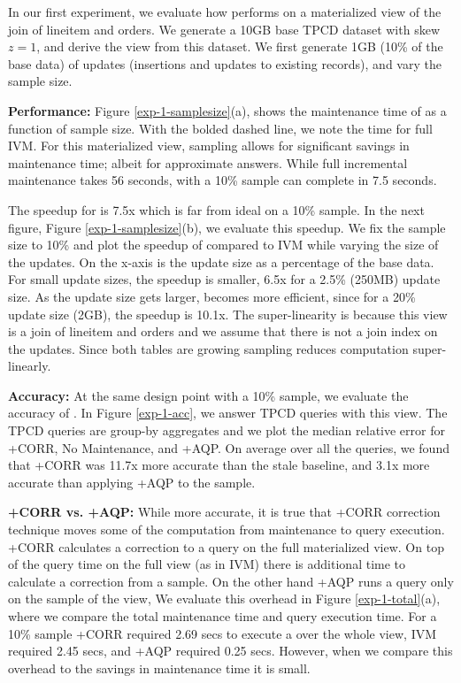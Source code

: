 In our first experiment, we evaluate how \svc performs on a materialized view of the join of \textsf{lineitem} and \textsf{orders}.
We generate a 10GB base TPCD dataset with skew $z=1$, and derive the view from this dataset.
We first generate 1GB (10\% of the base data) of updates (insertions and updates to existing records), and vary the sample size.

\textbf{Performance:}
Figure \ref{exp-1-samplesize}(a), shows the maintenance time of \svc as a function of sample size.
With the bolded dashed line, we note the time for full IVM. 
For this materialized view, sampling allows for significant savings in maintenance time; albeit for approximate answers.
While full incremental maintenance takes 56 seconds, \svc with a 10\% sample can complete in 7.5 seconds.

The speedup for  is 7.5x which is far from ideal on a 10\% sample.
In the next figure, Figure \ref{exp-1-samplesize}(b), we evaluate this speedup. 
We fix the sample size to 10\% and plot the speedup of \svc compared to IVM while varying the size of the updates.
On the x-axis is the update size as a percentage of the base data.
For small update sizes, the speedup is smaller, 6.5x for a 2.5\% (250MB) update size.
As the update size gets larger, \svc becomes more efficient, since for a 20\% update size (2GB), the speedup is 10.1x. 
The super-linearity is because this view is a join of \textsf{lineitem} and \textsf{orders} and we assume that there is not a join index on the updates.
Since both tables are growing sampling reduces computation super-linearly. 

\textbf{Accuracy:}
At the same design point with a 10\% sample, we evaluate the accuracy of \svc.
In Figure \ref{exp-1-acc}, we answer TPCD queries with this view.
The TPCD queries are group-by aggregates and we plot the median relative error for \svcnospace+CORR, No Maintenance, and \svcnospace+AQP.
On average over all the queries, we found that \svcnospace+CORR was 11.7x more accurate than the stale baseline, and 3.1x more accurate than applying \svcnospace+AQP to the sample.

\textbf{\svcnospace+CORR vs. \svcnospace+AQP:}
While more accurate, it is true that \svcnospace+CORR correction technique moves some of the computation from maintenance to query execution.
\svcnospace+CORR calculates a correction to a query on the full materialized view.
On top of the query time on the full view (as in IVM) there is additional time to calculate a correction from a sample.
On the other hand \svcnospace+AQP runs a query only on the sample of the view, 
We evaluate this overhead in Figure \ref{exp-1-total}(a), where we compare the total maintenance time and query execution time.
For a 10\% sample \svcnospace+CORR required 2.69 secs to execute a \sumfunc over the whole view, IVM required 2.45 secs, and  \svcnospace+AQP required 0.25 secs.
However, when we compare this overhead to the savings in maintenance time it is small.


